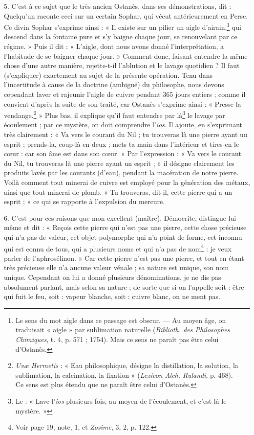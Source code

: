 \documentclass[a4paper, 11pt, oneside, polutonikogreek, french]{article}
\begin{document}
5. C'est à ce sujet que le très ancien Ostanès, dans ses démonstrations, dit : Quelqu'un raconte ceci sur un certain Sophar, qui vécut antérieurement en Perse. Ce divin Sophar s'exprime ainsi : « Il existe sur un pilier un aigle d'airain,\footnote{Le sens du mot aigle dans ce passage est obscur. --- Au moyen âge, on traduisait « aigle » par sublimation naturelle (\emph{Biblioth. des Philosophes Chimiques}, t. 4, p. 571 ; 1754). Mais ce sens ne paraît pas être celui d'Ostanès.} qui descend dans la fontaine pure et s'y baigne chaque jour, se renouvelant par ce régime. » Puis il dit : « L'aigle, dont nous avons donné l'interprétation, a l'habitude de se baigner chaque jour. » Comment donc, faisant entendre la même chose d'une autre manière, rejette-t-il l'ablution et le lavage quotidien ? Il faut (s'expliquer) exactement au sujet de la présente opération. Tenu dans l'incertitude à cause de la doctrine (ambiguë) du philosophe, nous devons cependant laver et rajeunir l'aigle de cuivre pendant 365 jours entiers ; comme il convient d'après la suite de son traité, car Ostanès s'exprime ainsi : « Presse la vendange.\footnote{\emph{Uvæ Hermetis} : « Eau philosophique, désigne la distillation, la solution, la sublimation, la calcination, la fixation » (\emph{Lexicon Alch. Rulandi}, p. 468). --- Ce sens est plus étendu que ne paraît être celui d'Ostanès.} » Plus bas, il explique qu'il faut entendre par là\footnote{Lc : « Lave l'\emph{ios} plusieurs fois, au moyen de l'écoulement, et c'est là le mystère. »} le lavage par écoulement ; par ce mystère, on doit comprendre l'\emph{ios}. Il ajoute, en s'exprimant très clairement : « Va vers le courant du Nil ; tu trouveras là une pierre ayant un esprit ; prends-la, coup-là en deux ; mets ta main dans l'intérieur et tires-en le cœur : car son âme est dans son cœur. » Par l'expression : « Va vers le courant du Nil, tu trouveras là une pierre ayant un esprit ; » il désigne clairement les produits lavés par les courants (d'eau), pendant la macération de notre pierre. Voilà comment tout minerai de cuivre est employé pour la génération des métaux, ainsi que tout minerai de plomb. « Tu trouveras, dit-il, cette pierre qui a un esprit ; » ce qui se rapporte à l'expulsion du mercure.

6. C'est pour ces raisons que mon excellent (maître), Démocrite, distingue lui-même et dit : « Reçois cette pierre qui n'est pas une pierre, cette chose précieuse qui n'a pas de valeur, cet objet polymorphe qui n'a point de forme, cet inconnu qui est connu de tous, qui a plusieurs noms et qui n'a pas de nom\footnote{Voir page 19, note, 1, et \emph{Zosime}, 3, 2, p. 122.} : je veux parler de l'aphrosélinon. » Car cette pierre n'est pas une pierre, et tout en étant très précieuse elle n'a aucune valeur vénale ; sa nature est unique, son nom unique. Cependant on lui a donné plusieurs dénominations, je ne dis pas absolument parlant, mais selon sa nature ; de sorte que si on l'appelle soit : être qui fuit le feu, soit : vapeur blanche, soit : cuivre blanc, on ne ment pas.
\end{document}
